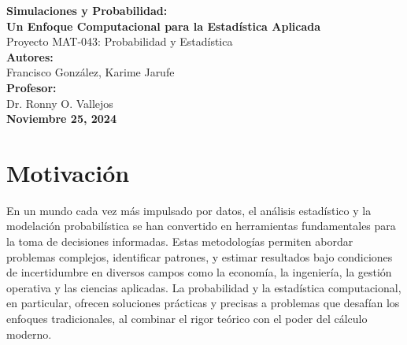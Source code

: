 \documentclass[12pt]{article}
\begin{document}
\begin{titlepage}
    \centering
    \vspace*{1cm}  %

    \vspace{2cm}  %

    {\LARGE \textbf{Simulaciones y Probabilidad:}} \\[0.5cm]
    {\LARGE \textbf{Un Enfoque Computacional para la Estadística Aplicada}} \\[1.5cm]

    {\Large Proyecto MAT-043: Probabilidad y Estadística} \\[0.5cm]

    \vspace{1cm}
    {\large \textbf{Autores:}} \\[0.3cm]
    {\large Francisco González, Karime Jarufe} \\[1.5cm]

    {\large \textbf{Profesor:}} \\[0.3cm]
    {\large Dr. Ronny O. Vallejos} \\[2.5cm]

    {\large \textbf{Noviembre 25, 2024}} \\

    \vfill  %

\end{titlepage}


\newpage
\tableofcontents
\newpage

\section{Motivación}

En un mundo cada vez más impulsado por datos, el análisis estadístico y la modelación probabilística se han convertido en herramientas fundamentales para la toma de decisiones informadas. Estas metodologías permiten abordar problemas complejos, identificar patrones, y estimar resultados bajo condiciones de incertidumbre en diversos campos como la economía, la ingeniería, la gestión operativa y las ciencias aplicadas. La probabilidad y la estadística computacional, en particular, ofrecen soluciones prácticas y precisas a problemas que desafían los enfoques tradicionales, al combinar el rigor teórico con el poder del cálculo moderno.
\end{document}

